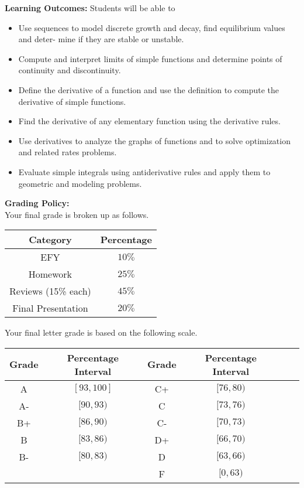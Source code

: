 \documentclass[11pt, a4paper]{article}
\begin{document}
\vspace*{.15in}
\noindent\textbf{Learning Outcomes:} Students will be able to
\begin{itemize}
\item Use sequences to model discrete growth and decay, find equilibrium values and deter- mine if they are stable or unstable.
\item	Compute and interpret limits of simple functions and determine points of continuity and discontinuity.
\item	Define the derivative of a function and use the definition to compute the derivative of simple functions.
\item	Find the derivative of any elementary function using the derivative rules.
\item	Use derivatives to analyze the graphs of functions and to solve optimization and related
rates problems.
\item	Evaluate simple integrals using antiderivative rules and apply them to geometric and modeling problems.
\end{itemize}

\noindent\textbf{Grading Policy:}~\\
Your final grade is broken up as follows. 
\begin{center}
\begin{tabular}{|cc|}
  \hline
  Category & Percentage\\
  \hline
  EFY & $10\%$\\
  Homework & $25\%$\\
  Reviews (15\% each) & $45\%$\\
  Final Presentation & $20\%$\\
  \hline
\end{tabular}
\end{center}

\newpage
Your final letter grade is based on the following scale.
\begin{center}
\begin{tabular}{|cc | cc | cc|}
  \hline
  Grade & Percentage Interval & Grade & Percentage Interval\\
  \hline
  A & $[93,100]$ & C+ & $[76,80)$\\
  A- & $[90,93)$ & C & $[73,76)$ \\
  B+ & $[86,90)$ & C- & $[70,73)$\\
  B & $[83,86)$ & D+ & $[66,70)$\\
  B- & $[80,83)$ & D & $[63,66)$\\
     &           & F & $[0,63)$\\
  \hline
\end{tabular}
\end{center}
\end{document}

